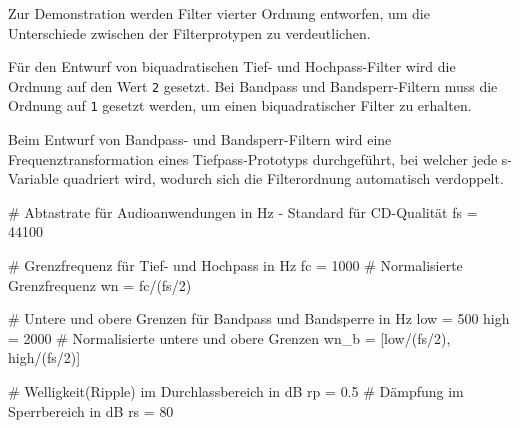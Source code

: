\documentclass[
  ngerman,
  letterpaper,
  DIV=11]{scrreprt}
\newenvironment{Shaded}{\begin{snugshade}}{\end{snugshade}}
\newcommand{\CommentTok}[1]{\textcolor[rgb]{0.37,0.37,0.37}{#1}}
\newcommand{\DecValTok}[1]{\textcolor[rgb]{0.68,0.00,0.00}{#1}}
\newcommand{\FloatTok}[1]{\textcolor[rgb]{0.68,0.00,0.00}{#1}}
\newcommand{\NormalTok}[1]{\textcolor[rgb]{0.00,0.23,0.31}{#1}}
\newcommand{\OperatorTok}[1]{\textcolor[rgb]{0.37,0.37,0.37}{#1}}
\begin{document}
Zur Demonstration werden Filter vierter Ordnung entworfen, um die
Unterschiede zwischen der Filterprotypen zu verdeutlichen.

Für den Entwurf von biquadratischen Tief- und Hochpass-Filter wird die
Ordnung auf den Wert \texttt{2} gesetzt. Bei Bandpass und
Bandsperr-Filtern muss die Ordnung auf \texttt{1} gesetzt werden, um
einen biquadratischer Filter zu erhalten.

Beim Entwurf von Bandpass- und Bandsperr-Filtern wird eine
Frequenztransformation eines Tiefpass-Prototyps durchgeführt, bei
welcher jede s-Variable quadriert wird, wodurch sich die Filterordnung
automatisch verdoppelt.

\begin{Shaded}
\begin{Highlighting}[]
\CommentTok{\# Abtastrate für Audioanwendungen in Hz {-} Standard für CD{-}Qualität}
\NormalTok{fs }\OperatorTok{=} \DecValTok{44100}
\end{Highlighting}
\end{Shaded}

\begin{Shaded}
\begin{Highlighting}[]
\CommentTok{\# Grenzfrequenz für Tief{-} und Hochpass in Hz}
\NormalTok{fc }\OperatorTok{=} \DecValTok{1000}
\CommentTok{\# Normalisierte Grenzfrequenz}
\NormalTok{wn }\OperatorTok{=}\NormalTok{ fc}\OperatorTok{/}\NormalTok{(fs}\OperatorTok{/}\DecValTok{2}\NormalTok{)}
\end{Highlighting}
\end{Shaded}

\begin{Shaded}
\begin{Highlighting}[]
\CommentTok{\# Untere und obere Grenzen für Bandpass und Bandsperre in Hz}
\NormalTok{low }\OperatorTok{=} \DecValTok{500}
\NormalTok{high }\OperatorTok{=} \DecValTok{2000}
\CommentTok{\# Normalisierte untere und obere Grenzen}
\NormalTok{wn\_b }\OperatorTok{=}\NormalTok{ [low}\OperatorTok{/}\NormalTok{(fs}\OperatorTok{/}\DecValTok{2}\NormalTok{), high}\OperatorTok{/}\NormalTok{(fs}\OperatorTok{/}\DecValTok{2}\NormalTok{)]}
\end{Highlighting}
\end{Shaded}

\begin{Shaded}
\begin{Highlighting}[]
\CommentTok{\# Welligkeit(Ripple) im Durchlassbereich in dB}
\NormalTok{rp }\OperatorTok{=} \FloatTok{0.5}
\CommentTok{\# Dämpfung im Sperrbereich in dB}
\NormalTok{rs }\OperatorTok{=} \DecValTok{80}
\end{Highlighting}
\end{Shaded}
\end{document}

